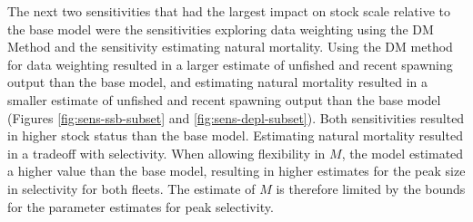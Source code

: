 \documentclass[11pt,
  english,
  letterpaper,
]{article}
\begin{document}
The next two sensitivities that had the largest impact on stock scale relative to the base model were the sensitivities exploring data weighting using the DM Method and the sensitivity estimating natural mortality. Using the DM method for data weighting resulted in a larger estimate of unfished and recent spawning output than the base model, and estimating natural mortality resulted in a smaller estimate of unfished and recent spawning output than the base model (Figures \ref{fig:sens-ssb-subset} and \ref{fig:sens-depl-subset}). Both sensitivities resulted in higher stock status than the base model. Estimating natural mortality resulted in a tradeoff with selectivity. When allowing flexibility in {\(M\)\leavevmode\tagmcend\tagstructend}, the model estimated a higher value than the base model, resulting in higher estimates for the peak size in selectivity for both fleets. The estimate of {\(M\)\leavevmode\tagmcend\tagstructend} is therefore limited by the bounds for the parameter estimates for peak selectivity.

\leavevmode\tagmcend\tagstructend\par

\end{document}
